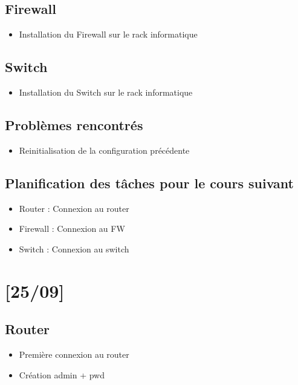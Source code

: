\documentclass{article}
\begin{document}
\subsection{Firewall}

\begin{itemize}
\item Installation du Firewall sur le rack informatique
\end{itemize}

\subsection{Switch}

\begin{itemize}
\item Installation du Switch sur le rack informatique
\end{itemize}

\subsection{Problèmes rencontrés}

\begin{itemize}
\item Reinitialisation de la configuration précédente
\end{itemize} 

\subsection{Planification des tâches pour le cours suivant}

\begin{itemize}
\item Router : Connexion au router
\item Firewall : Connexion au FW
\item Switch : Connexion au switch
\end{itemize}

\newpage

\section{[25/09]}

\subsection{Router}

\begin{itemize}

\item Première connexion au router
\item Création admin + pwd
\end{itemize}
\end{document}
